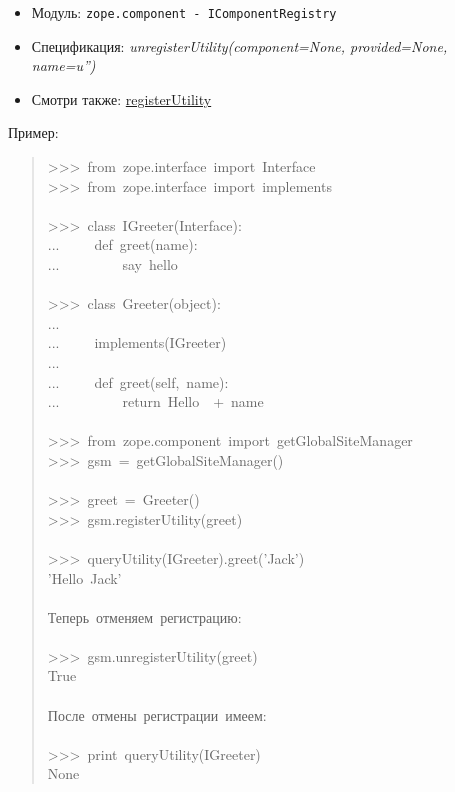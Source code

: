 \documentclass[14pt,a4paper,openany,twoside,final]{extbook}
\providecommand*{\DUroletitlereference}[1]{\textsl{#1}}
\begin{document}
\begin{itemize}

\item Модуль: \texttt{zope.component - IComponentRegistry}

\item Спецификация: \DUroletitlereference{unregisterUtility(component=None, provided=None,
name=u'')}

\item Смотри также: \hyperref[registerutility]{registerUtility}

\end{itemize}

Пример:

\begin{quote}{\ttfamily \raggedright \noindent
>{}>{}>~from~zope.interface~import~Interface\\
>{}>{}>~from~zope.interface~import~implements\\
~\\
>{}>{}>~class~IGreeter(Interface):\\
...~~~~~def~greet(name):\\
...~~~~~~~~~\textquotedbl{}say~hello\textquotedbl{}\\
~\\
>{}>{}>~class~Greeter(object):\\
...\\
...~~~~~implements(IGreeter)\\
...\\
...~~~~~def~greet(self,~name):\\
...~~~~~~~~~return~\textquotedbl{}Hello~\textquotedbl{}~+~name\\
~\\
>{}>{}>~from~zope.component~import~getGlobalSiteManager\\
>{}>{}>~gsm~=~getGlobalSiteManager()\\
~\\
>{}>{}>~greet~=~Greeter()\\
>{}>{}>~gsm.registerUtility(greet)\\
~\\
>{}>{}>~queryUtility(IGreeter).greet('Jack')\\
'Hello~Jack'\\
~\\
Теперь~отменяем~регистрацию:\\
~\\
>{}>{}>~gsm.unregisterUtility(greet)\\
True\\
~\\
После~отмены~регистрации~имеем:\\
~\\
>{}>{}>~print~queryUtility(IGreeter)\\
None
}
\end{quote}
\end{document}
